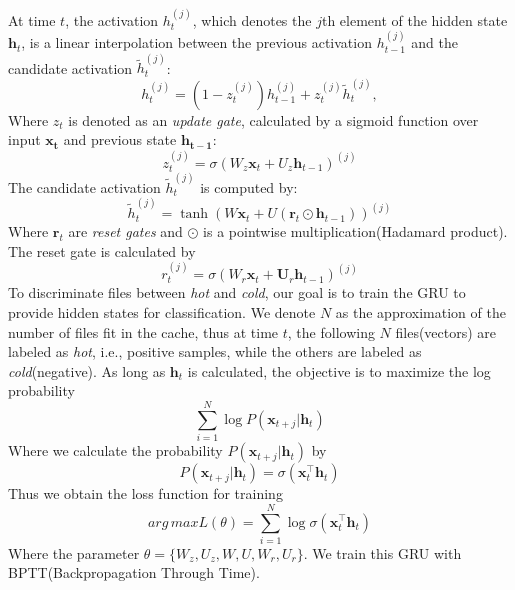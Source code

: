 \documentclass[conference]{IEEEtran}
\begin{document}
At time $t$, the activation $h_t^{(j)}$, which denotes the $j$th element of the hidden state $\mathbf{h}_t$, is a linear interpolation between the previous activation $h_{t-1}^{(j)}$ and the candidate activation $\tilde{h}_t^{(j)}$:
\begin{equation}
    h_t^{(j)} = (1-z_t^{(j)}) h_{t-1}^{(j)} + z_t^{(j)}\tilde{h}_t^{(j)},
\end{equation}
Where $z_t$ is denoted as an \textit{update gate}, calculated by a sigmoid function over input $\mathbf{x_t}$ and previous state $\mathbf{h_{t-1}}$:
\begin{equation}
z_t^{(j)} = \sigma(W_z \mathbf{x}_t + U_z \mathbf{h}_{t-1})^{(j)}
\end{equation}
The candidate activation $\tilde{h}_t^{(j)}$ is computed by:
\begin{equation}
    \tilde{h}_t^{(j)} = \tanh(W \mathbf{x}_t + U (\mathbf{r}_t \odot \mathbf{h}_{t-1}))^{(j)}
\end{equation}
Where $\mathbf{r}_t$ are \textit{reset gates} and $\odot$ is a pointwise multiplication(Hadamard product).
The reset gate is calculated by
\begin{equation}
    r_t^{(j)} = \sigma(W_r \mathbf{x}_t + \mathbf{U}_r \mathbf{h}_{t-1})^{(j)}
\end{equation}
To discriminate files between \textit{hot} and \textit{cold}, our goal is to train the GRU to provide hidden states for classification. We denote $N$ as the approximation of the number of files fit in the cache, thus at time $t$, the following $N$ files(vectors) are labeled as \textit{hot}, i.e., positive samples, while the others are labeled as \textit{cold}(negative). As long as $\mathbf{h}_t$ is calculated, the objective is to maximize the log probability
\begin{equation}
    \label{eq.obj}
    \sum_{i=1}^N \log P(\mathbf{x}_{t+j}|\mathbf{h}_t)
\end{equation}
Where we calculate the probability $P(\mathbf{x}_{t+j}|\mathbf{h}_t)$ by
\begin{equation}
    P(\mathbf{x}_{t+j}|\mathbf{h}_t) = \sigma(\mathbf{x}^\top_t \mathbf{h}_t)
\end{equation}
Thus we obtain the loss function for training
\begin{equation}
    arg\,max L(\theta) = \sum_{i=1}^N \log \sigma(\mathbf{x}^\top_t \mathbf{h}_t)
\end{equation}
Where the parameter $\theta = \{W_z, U_z, W, U, W_r, U_r\}$. We train this GRU with BPTT(Backpropagation Through Time).
\end{document}
